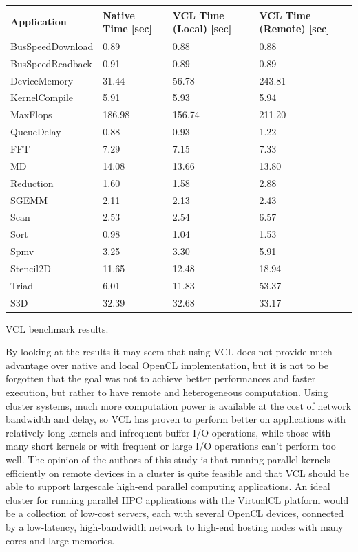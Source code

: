 \begin{tablehere}
{\footnotesize
\begin{tabular}{|p{}|p{}|p{}|p{}|}\hline
\textbf{Application} & \textbf{Native Time} [sec] & \textbf{VCL Time (Local)} [sec] & \textbf{VCL Time (Remote)} [sec]\\ \hline
BusSpeedDownload & 0.89 & 0.88 & 0.88 \\ \hline
BusSpeedReadback & 0.91 & 0.89 & 0.89 \\ \hline
DeviceMemory & 31.44 & 56.78 & 243.81 \\ \hline
KernelCompile & 5.91 & 5.93 & 5.94 \\ \hline
MaxFlops & 186.98 & 156.74 & 211.20 \\ \hline
QueueDelay & 0.88 & 0.93 & 1.22 \\ \hline
FFT & 7.29 & 7.15 & 7.33 \\ \hline
MD & 14.08 & 13.66 & 13.80 \\ \hline
Reduction & 1.60 & 1.58 & 2.88 \\ \hline
SGEMM & 2.11 & 2.13 & 2.43 \\ \hline
Scan & 2.53 & 2.54 & 6.57 \\ \hline
Sort & 0.98 & 1.04 & 1.53 \\ \hline
Spmv & 3.25 & 3.30 & 5.91 \\ \hline
Stencil2D & 11.65 & 12.48 & 18.94 \\ \hline
Triad & 6.01 & 11.83 & 53.37 \\ \hline
S3D & 32.39 & 32.68 & 33.17 \\ \hline
\end{tabular}}
  \caption{VCL benchmark results.\\}
	\label{tab:VCLBenchmark}
\end{tablehere}


By looking at the results it may seem that using VCL does not provide much advantage over native and local OpenCL implementation, but it is not to be forgotten that the goal was not to achieve better performances and faster execution, but rather to have remote and heterogeneous computation. Using cluster systems, much more computation power is available at the cost of network bandwidth and delay, so VCL has proven to perform better on applications with relatively long kernels and infrequent buffer-I/O operations, while those with many short kernels or with frequent or large I/O operations can't perform too well.
The opinion of the authors of this study is that running parallel kernels efficiently on remote devices in a cluster is quite feasible
and that VCL should be able to support largescale high-end parallel computing applications.
An ideal cluster for running parallel HPC applications with the VirtualCL platform would be a collection of low-cost servers, each with several OpenCL devices, connected by a low-latency, high-bandwidth network to high-end hosting nodes with many cores and large memories.








